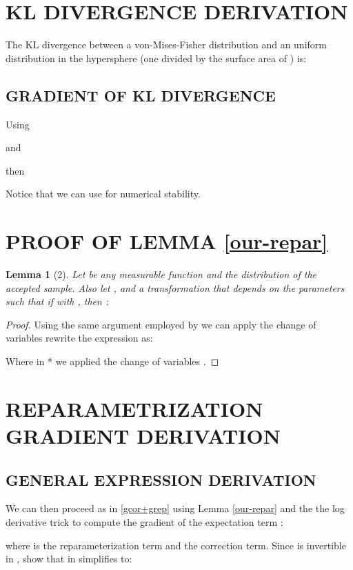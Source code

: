 \documentclass[letterpaper]{article}
\newtheorem{lem}{\textbf{Lemma}}
\begin{document}
\section{KL DIVERGENCE DERIVATION}\label{ap:kl-divergence}


The KL divergence between a von-Mises-Fisher distribution  and an uniform distribution in the hypersphere (one divided by the surface area of )  is:


\subsection{GRADIENT OF KL DIVERGENCE}
Using

and

then

Notice that we can use  for numerical stability.

\section{PROOF OF LEMMA \ref{our-repar} } \label{app:reparameterization-trick}
\begin{lem}[2]
Let  be any measurable function and  the distribution of the accepted sample. 
Also let , and  a transformation that depends on the parameters such that if  with , then :

\end{lem}
\begin{proof}

    
Using the same argument employed by \citet{rejection-repar} we can apply the change of variables  rewrite the expression as:

Where in * we applied the change of variables .
\end{proof}

\section{REPARAMETRIZATION GRADIENT DERIVATION} \label{ap:gradient-deriv}
\subsection{GENERAL EXPRESSION DERIVATION}
We can then proceed as in \ref{gcor+grep} using Lemma \ref{our-repar} and the the log derivative trick to compute the gradient of the expectation term :

where  is the reparameterization term and  the correction term.
Since  is invertible in , \citet{rejection-repar} show that  in  simplifies to:
\end{document}
